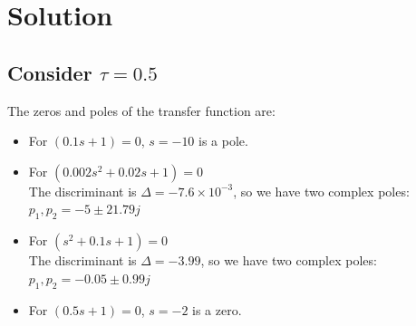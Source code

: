 \documentclass[a4paper]{article}
\begin{document}
\section*{Solution}
\subsection*{Consider $\tau = 0.5$}
The zeros and poles of the transfer function are:
\begin{itemize}
    \item For $(0.1s+1)=0$, $s=-10$ is a pole.
    \item For $(0.002s^2+0.02s+1)=0$\\
    The discriminant is $\Delta=-7.6\times10^{-3}$, so we have two complex poles:  $p_1,p_2 = -5\pm21.79j$
    \item For $(s^2+0.1s+1)=0$\\
    The discriminant is $\Delta = -3.99$, so we have two complex poles: $p_1,p_2=-0.05 \pm 0.99j$
    \item For $(0.5s+1)=0$, $s=-2$ is a zero.
\end{itemize}
\end{document}
